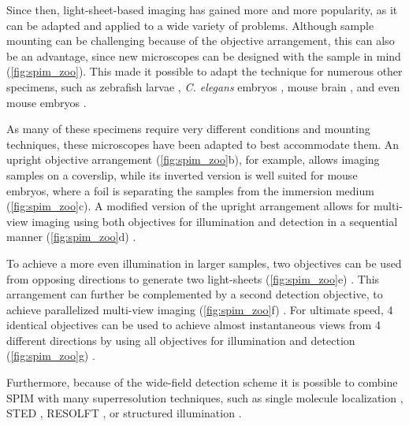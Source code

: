   Since then, light-sheet-based imaging has gained more and more popularity, as it can be adapted and applied to a wide variety of problems. Although sample mounting can be challenging because of the objective arrangement, this can also be an advantage, since new microscopes can be designed with the sample in mind \cite{huisken_selective_2009, de_medeiros_light-sheet_2016} (\autoref{fig:spim_zoo}). This made it possible to adapt the technique for numerous other specimens, such as zebrafish larvae \cite{keller_reconstruction_2008}, \textit{C. elegans} embryos \cite{wu_inverted_2011}, mouse brain \cite{dodt_ultramicroscopy:_2007}, and even mouse embryos \cite{ichikawa_live_2013, udan_quantitative_2014, strnad_inverted_2016}.

  As many of these specimens require very different conditions and mounting techniques, these microscopes have been adapted to best accommodate them. An upright objective arrangement (\autoref{fig:spim_zoo}b), for example, allows imaging samples on a coverslip, while its inverted version is well suited for mouse embryos, where a foil is separating the samples from the immersion medium (\autoref{fig:spim_zoo}c). A modified version of the upright arrangement allows for multi-view imaging using both objectives for illumination and detection in a sequential manner (\autoref{fig:spim_zoo}d) \cite{kumar_dual-view_2014}.

  To achieve a more even illumination in larger samples, two objectives can be used from opposing directions to generate two light-sheets (\autoref{fig:spim_zoo}e) \cite{huisken_even_2007}. This arrangement can further be complemented by a second detection objective, to achieve parallelized multi-view imaging (\autoref{fig:spim_zoo}f) \cite{krzic_multiview_2012,tomer_quantitative_2012, schmid_high-speed_2013}. For ultimate speed, 4 identical objectives can be used to achieve almost instantaneous views from 4 different directions by using all objectives for illumination and detection (\autoref{fig:spim_zoo}g) \cite{chhetri_whole-animal_2015}. 

  Furthermore, because of the wide-field detection scheme it is possible to combine SPIM with many superresolution techniques, such as single molecule localization \cite{cella_zanacchi_live-cell_2011}, STED \cite{friedrich_sted-spim:_2011}, RESOLFT \cite{hoyer_breaking_2016}, or structured illumination \cite{keller_fast_2010,chen_lattice_2014,chang_csilsfm_2017}.





